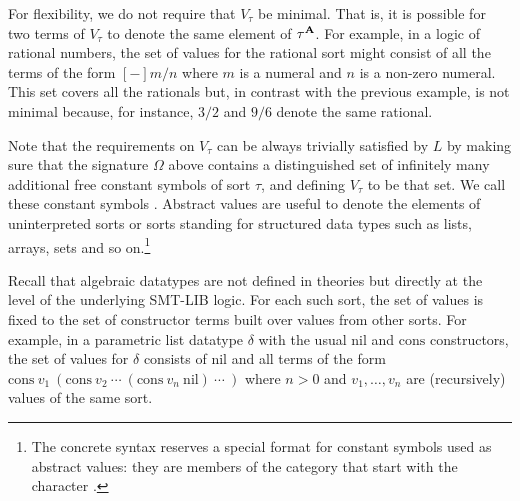 For flexibility, we do not require that $V_\tau$ be minimal.
That is, it is possible for two terms of $V_\tau$ to denote 
the same element of $\tau^{\mathbf{A}}$.
For example,
in a logic of rational numbers, the set of values for the rational sort
might consist of all the terms of the form $[-]m/n$
where $m$ is a numeral and $n$ is a non-zero numeral.
This set covers all the rationals 
but, in contrast with the previous example, is not minimal
because, for instance, $3/2$ and $9/6$ denote the same rational.

Note that the requirements on $V_\tau$ can be always trivially satisfied 
by $L$ by making sure that the signature
$\Omega$ above contains 
a distinguished set of infinitely many additional free constant symbols of 
sort $\tau$,
and defining $V_\tau$ to be that set.
We call these constant symbols .
Abstract values are useful to denote the elements of uninterpreted  
sorts or sorts standing for structured data types
such as lists, arrays, sets and so on.\footnote{%
The concrete syntax reserves a special format for constant symbols 
used as abstract values: 
they are members of the  category 
that start with the character .
}

Recall that algebraic datatypes are not defined in theories but directly 
at the level of the underlying SMT-LIB logic. 
For each such sort, the set of values is fixed to the set 
of constructor terms built over values from other sorts.
For example, in a parametric list datatype $\delta$ 
with the usual $\mathrm{nil}$ and $\mathrm{cons}$ constructors,
the set of values for $\delta$ consists of $\mathrm{nil}$ and 
all terms of the form 
$\mathrm{cons}\ v_1\ (\mathrm{cons}\ v_2\ \cdots\ (\mathrm{cons}\ v_n\ \mathrm{nil})\ \cdots\ )$
where $n > 0$ and 
$v_1, \ldots, v_n$ are (recursively) values of the same sort.






